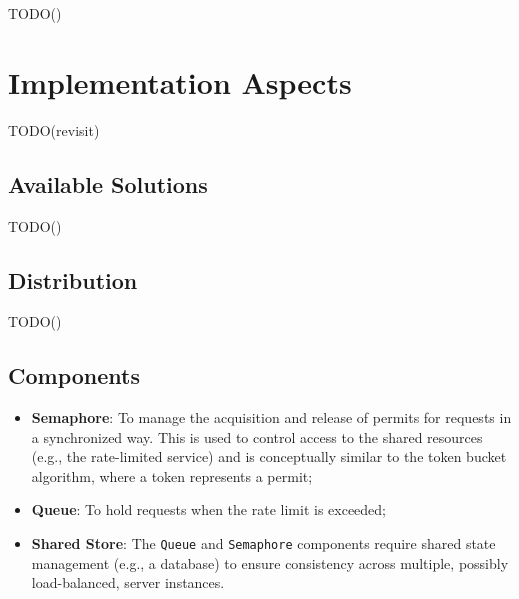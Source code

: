TODO()

\section{Implementation Aspects}\label{sec:rate-limiter-implementation}

TODO(revisit)

\subsection{Available Solutions}\label{subsec:rate-limiter-solutions}

TODO()

\subsection{Distribution}\label{subsec:rate-limiter-distribution}

TODO()


\subsection{Components}\label{subsec:rate-limiter-components}

\begin{itemize}
    \item \textbf{Semaphore}: To manage the acquisition and release of permits for requests in a synchronized way.
    This is used to control access to the shared resources (e.g., the rate-limited service) and is conceptually similar to the token bucket algorithm, where a token represents a permit;
    \item \textbf{Queue}: To hold requests when the rate limit is exceeded;
    \item \textbf{Shared Store}: The \texttt{Queue} and \texttt{Semaphore} components require shared state management (e.g., a database) to ensure consistency across multiple, possibly load-balanced, server instances.
\end{itemize}

